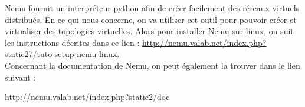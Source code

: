 Nemu fournit un interpréteur python afin de créer facilement des réseaux virtuels distribués.
En ce qui nous concerne, on va utiliser cet outil pour pouvoir créer et virtualiser des topologies virtuelles. Alors pour installer Nemu sur linux, on suit les instructions décrites dans ce lien : 
 \url{http://nemu.valab.net/index.php?static27/tuto-setup-nemu-linux}.
 \\
 Concernant la documentation de Nemu, on peut également la trouver dans le lien suivant : 
 \begin{center}
 \url{http://nemu.valab.net/index.php?static2/doc}
 \end{center}